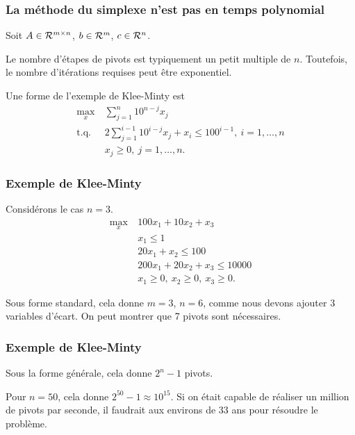 \documentclass[t, aspectratio=169,usepdftitle=false]{beamer}
\begin{document}
\begin{frame}
\frametitle{La méthode du simplexe n'est pas en temps polynomial}

Soit $A \in {\mathcal{R}}^{m \times n}$, $b \in {\mathcal{R}}^m$, $c \in {\mathcal{R}}^n$.

\mbox{}

Le nombre d'étapes de pivots est typiquement un petit multiple de $n$. Toutefois, le nombre d'itérations requises peut être exponentiel.

\mbox{}

Une forme de l'exemple de Klee-Minty est
\begin{align*}
\max_x \ & \sum_{j =1}^n 10^{n-j} x_j \\
\mbox{t.q. } & 2\sum_{j = 1}^{i-1} 10^{i-j} x_j + x_i \leq 100^{i-1},\ i = 1,\ldots, n\\
& x_j \geq 0,\ j = 1,\ldots, n.
\end{align*}

\end{frame}

\begin{frame}
\frametitle{Exemple de Klee-Minty}

Considérons le cas $n = 3$.
\begin{align*}
\max_x \ & 100x_1 + 10x_2 + x_3\\
& x_1 \leq 1 \\
& 20 x_1 + x_2 \leq 100 \\
& 200 x_1 + 20 x_2 + x_3 \leq 10000 \\
& x_1 \geq 0,\ x_2 \geq 0,\ x_3 \geq 0.
\end{align*}

\mbox{}

Sous forme standard, cela donne $m = 3$, $n = 6$, comme nous devons ajouter 3 variables d'écart. On peut montrer que 7 pivots sont nécessaires.

\end{frame}

\begin{frame}
\frametitle{Exemple de Klee-Minty}

Sous la forme générale, cela donne $2^n - 1$ pivots.

\mbox{}

Pour $n = 50$, cela donne $2^{50} - 1 \approx 10^{15}$. Si on était capable de réaliser un million de pivots par seconde, il faudrait aux environs de 33 ans pour résoudre le problème.

\end{frame}
\end{document}
